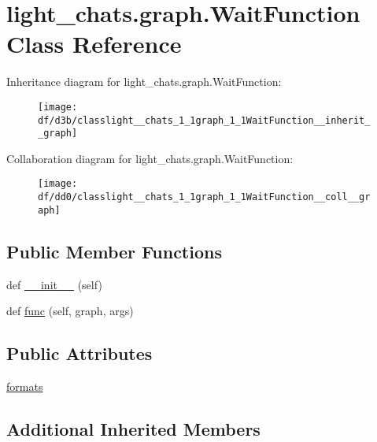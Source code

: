 \hypertarget{classlight__chats_1_1graph_1_1WaitFunction}{}\section{light\+\_\+chats.\+graph.\+Wait\+Function Class Reference}
\label{classlight__chats_1_1graph_1_1WaitFunction}


Inheritance diagram for light\+\_\+chats.\+graph.\+Wait\+Function\+:\nopagebreak
\begin{figure}[H]
\begin{center}
\leavevmode
\texttt{[image: df/d3b/classlight\_\_chats\_1\_1graph\_1\_1WaitFunction\_\_inherit\_\_graph]}
\end{center}
\end{figure}


Collaboration diagram for light\+\_\+chats.\+graph.\+Wait\+Function\+:\nopagebreak
\begin{figure}[H]
\begin{center}
\leavevmode
\texttt{[image: df/dd0/classlight\_\_chats\_1\_1graph\_1\_1WaitFunction\_\_coll\_\_graph]}
\end{center}
\end{figure}
\subsection*{Public Member Functions}
\begin{DoxyCompactItemize}
\item 
def \hyperlink{classlight__chats_1_1graph_1_1WaitFunction_a08ecc57f17be491ed6a1ee81f38d8d65}{\+\_\+\+\_\+init\+\_\+\+\_\+} (self)
\item 
def \hyperlink{classlight__chats_1_1graph_1_1WaitFunction_a3349dc4d65c4b33440624bdbbeeb420c}{func} (self, graph, args)
\end{DoxyCompactItemize}
\subsection*{Public Attributes}
\begin{DoxyCompactItemize}
\item 
\hyperlink{classlight__chats_1_1graph_1_1WaitFunction_a02e41ee37f4a2fe83153606100a5f979}{formats}
\end{DoxyCompactItemize}
\subsection*{Additional Inherited Members}



